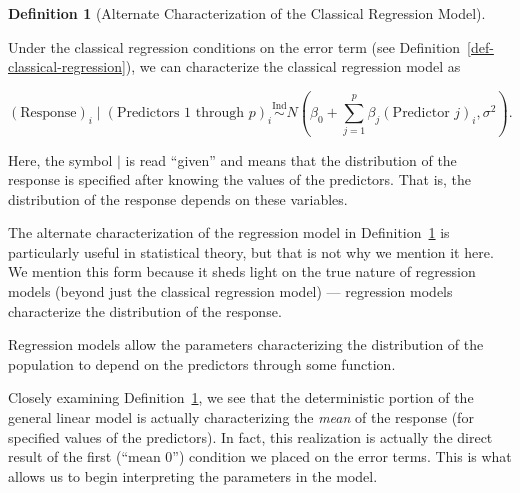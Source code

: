 \documentclass[
  letterpaper,
  DIV=11,
  numbers=noendperiod]{scrreprt}
\theoremstyle{definition}
\theoremstyle{definition}
\newtheorem{definition}{Definition}[chapter]
\theoremstyle{remark}
\begin{document}
\begin{definition}[Alternate Characterization of the Classical
Regression
Model]\protect\hypertarget{def-alternate-characterization}{}\label{def-alternate-characterization}

Under the classical regression conditions on the error term (see
Definition~\ref{def-classical-regression}), we can characterize the
classical regression model as

\[(\text{Response})_i \mid (\text{Predictors 1 through } p)_i \stackrel{\text{Ind}}{\sim} N\left(\beta_0 + \sum\limits_{j=1}^{p} \beta_j (\text{Predictor } j)_i, \sigma^2\right).\]

Here, the symbol \(\mid\) is read ``given'' and means that the
distribution of the response is specified after knowing the values of
the predictors. That is, the distribution of the response depends on
these variables.

\end{definition}

The alternate characterization of the regression model in
Definition~\ref{def-alternate-characterization} is particularly useful
in statistical theory, but that is not why we mention it here. We
mention this form because it sheds light on the true nature of
regression models (beyond just the classical regression model) ---
regression models characterize the distribution of the response.

\begin{tcolorbox}[enhanced jigsaw, bottomrule=.15mm, titlerule=0mm, bottomtitle=1mm, colback=white, coltitle=black, rightrule=.15mm, leftrule=.75mm, toprule=.15mm, toptitle=1mm, left=2mm, opacityback=0, colframe=quarto-callout-tip-color-frame, breakable, title=\textcolor{quarto-callout-tip-color}{\faLightbulb}\hspace{0.5em}{Big Idea}, arc=.35mm, colbacktitle=quarto-callout-tip-color!10!white, opacitybacktitle=0.6]

Regression models allow the parameters characterizing the distribution
of the population to depend on the predictors through some function.

\end{tcolorbox}

Closely examining Definition~\ref{def-alternate-characterization}, we
see that the deterministic portion of the general linear model is
actually characterizing the \emph{mean} of the response (for specified
values of the predictors). In fact, this realization is actually the
direct result of the first (``mean 0'') condition we placed on the error
terms. This is what allows us to begin interpreting the parameters in
the model.
\end{document}
